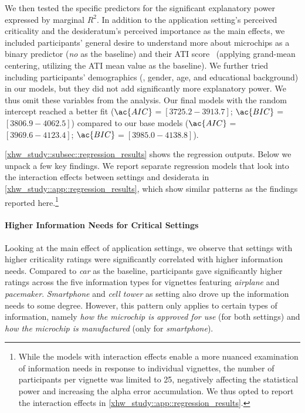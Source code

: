 We then tested the specific predictors for the significant explanatory power expressed by marginal $R^2$.
In addition to the application setting's perceived criticality and the desideratum's perceived importance as the main effects, we included participants' general desire to understand more about microchips as a binary predictor (\textit{no} as the baseline) and their \ac{ATI} score~\cite{franke2019personal} (applying grand-mean centering, utilizing the \ac{ATI} mean value as the baseline).
We further tried including participants' demographics (\ie, gender, age, and educational background) in our models, but they did not add significantly more explanatory power.
We thus omit these variables from the analysis.
Our final models with the random intercept reached a better fit ($\ac{AIC}$$=$$[3725.2 - 3913.7]$;  $\ac{BIC}$$=$$[3806.9 - 4062.5]$) compared to our base models ($\ac{AIC}$$=$$[3969.6 - 4123.4]$;  $\ac{BIC}$$=$$[3985.0 - 4138.8]$).

\autoref{xhw_study::subsec::regression_results} shows the regression outputs. 
Below we unpack a few key findings. 
We report separate regression models that look into the interaction effects between settings and desiderata in \autoref{xhw_study::app::regression_results}, which show similar patterns as the findings reported here.\footnote{While the models with interaction effects enable a more nuanced examination of information needs in response to individual vignettes, the number of participants per vignette was limited to 25, negatively affecting the statistical power and increasing the alpha error accumulation. 
We thus opted to report the interaction effects in \autoref{xhw_study::app::regression_results}.}



\paragraph{Higher Information Needs for Critical Settings} 
Looking at the main effect of application settings, we observe that settings with higher criticality ratings were significantly correlated with higher information needs. 
Compared to \textit{car} as the baseline, participants gave significantly higher ratings across the five information types for vignettes featuring \textit{airplane} and \textit{pacemaker}. 
\textit{Smartphone} and \textit{cell tower} as setting also drove up the information needs to some degree. 
However, this pattern only applies to certain types of information, namely \textit{how the microchip is approved for use} (for both settings) and \textit{how the microchip is manufactured} (only for \textit{smartphone}).

